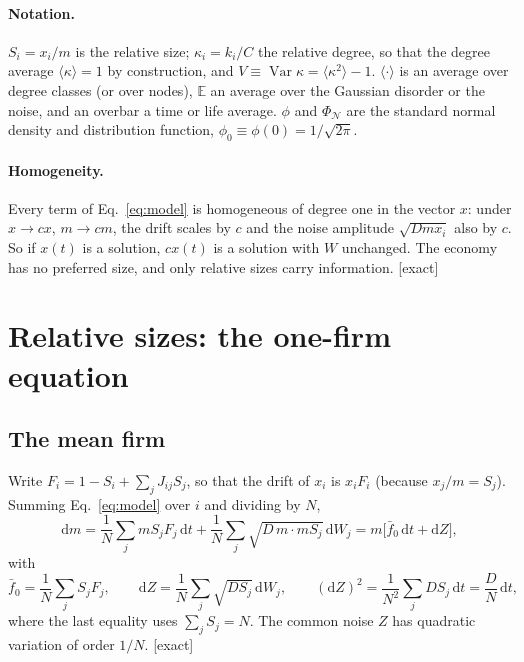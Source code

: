 \documentclass[11pt]{article}
\newcommand{\E}{\mathbb E}
\newcommand{\Var}{\operatorname{Var}}
\newcommand{\PhiN}{\Phi_{\mathcal N}}
\newcommand{\fb}{\bar f}
\newcommand{\dd}{\mathrm d}
\newcommand{\exact}{\textsf{\small[exact]}}
\begin{document}
\paragraph{Notation.}  $S_i=x_i/m$ is the relative size; $\kappa_i=k_i/C$ the relative degree, so that the
degree average $\langle\kappa\rangle=1$ by construction, and $V\equiv\Var\kappa=\langle\kappa^2\rangle-1$.
$\langle\cdot\rangle$ is an average over degree classes (or over nodes), $\E$ an average over the Gaussian
disorder or the noise, and an overbar a time or life average.  $\phi$ and $\PhiN$ are the standard normal
density and distribution function, $\phi_0\equiv\phi(0)=1/\sqrt{2\pi}$.

\paragraph{Homogeneity.}  Every term of Eq.~\eqref{eq:model} is homogeneous of degree one in the vector $x$:
under $x\to cx$, $m\to cm$, the drift scales by $c$ and the noise amplitude $\sqrt{Dmx_i}$ also by $c$.  So
if $x(t)$ is a solution, $cx(t)$ is a solution with $W$ unchanged.  The economy has no preferred size, and
only relative sizes carry information.  \exact

\section{Relative sizes: the one-firm equation}
\label{sec:relative}

\subsection{The mean firm}

Write $F_i=1-S_i+\sum_jJ_{ij}S_j$, so that the drift of $x_i$ is $x_iF_i$ (because $x_j/m=S_j$).  Summing
Eq.~\eqref{eq:model} over $i$ and dividing by $N$,
\begin{equation}
\dd m=\frac1N\sum_jmS_jF_j\,\dd t+\frac1N\sum_j\sqrt{D\,m\cdot mS_j}\,\dd W_j
=m\big[\fb_0\,\dd t+\dd Z\big],
\label{eq:dm}
\end{equation}
with
\begin{equation}
\fb_0=\frac1N\sum_jS_jF_j,\qquad \dd Z=\frac1N\sum_j\sqrt{DS_j}\,\dd W_j,\qquad
(\dd Z)^2=\frac{1}{N^2}\sum_jDS_j\,\dd t=\frac DN\,\dd t ,
\label{eq:Z}
\end{equation}
where the last equality uses $\sum_jS_j=N$.  The common noise $Z$ has quadratic variation of order
$1/N$.  \exact
\end{document}
